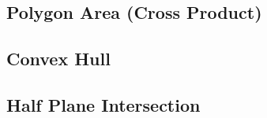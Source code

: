 \documentclass[11pt, letterpaper]{article}
\begin{document}
\subsection{Polygon Area (Cross Product)}


\subsection{Convex Hull}


\subsection{Half Plane Intersection}

\end{document}
